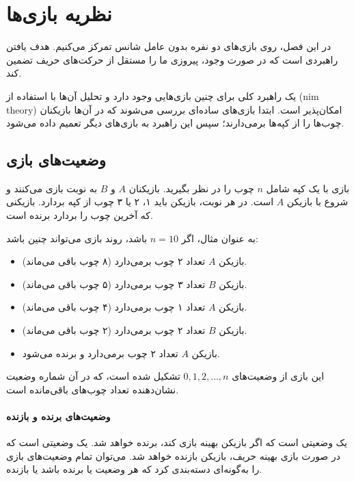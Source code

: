 \chapter{نظریه بازی‌ها}

در این فصل، روی بازی‌های دو نفره بدون عامل شانس تمرکز می‌کنیم.
هدف یافتن راهبردی است که در صورت وجود،
پیروزی ما را مستقل از حرکت‌های حریف
تضمین کند.

یک راهبرد کلی برای چنین بازی‌هایی وجود دارد
و تحلیل آن‌ها با استفاده از  (nim theory) امکان‌پذیر است.
ابتدا بازی‌های ساده‌ای بررسی می‌شوند که در آن‌ها
بازیکنان چوب‌ها را از کپه‌ها برمی‌دارند؛
سپس این راهبرد به بازی‌های دیگر تعمیم داده می‌شود.

\section{وضعیت‌های بازی}

بازی با یک کپه شامل $n$ چوب را در نظر بگیرید.
بازیکنان $A$ و $B$ به نوبت بازی می‌کنند
و شروع با بازیکن $A$ است.
در هر نوبت، بازیکن باید
۱، ۲ یا ۳ چوب از کپه بردارد.
بازیکنی که آخرین چوب را بردارد برنده است.

به عنوان مثال، اگر $n=10$ باشد، روند بازی می‌تواند چنین باشد:
\begin{itemize}[noitemsep]
\item بازیکن $A$ تعداد ۲ چوب برمی‌دارد (۸ چوب باقی می‌ماند).
\item بازیکن $B$ تعداد ۳ چوب برمی‌دارد (۵ چوب باقی می‌ماند).
\item بازیکن $A$ تعداد ۱ چوب برمی‌دارد (۴ چوب باقی می‌ماند).
\item بازیکن $B$ تعداد ۲ چوب برمی‌دارد (۲ چوب باقی می‌ماند).
\item بازیکن $A$ تعداد ۲ چوب برمی‌دارد و برنده می‌شود.
\end{itemize}

این بازی از وضعیت‌های $0,1,2,\ldots,n$ تشکیل شده است،
که در آن شماره وضعیت نشان‌دهنده
تعداد چوب‌های باقی‌مانده است.

\subsubsection{وضعیت‌های برنده و بازنده}


یک  وضعیتی است که
اگر بازیکن بهینه بازی کند،
برنده خواهد شد.
یک  وضعیتی است
که در صورت بازی بهینه حریف،
بازیکن بازنده خواهد شد.
می‌توان تمام وضعیت‌های بازی را به‌گونه‌ای دسته‌بندی کرد
که هر وضعیت یا برنده باشد یا بازنده.

